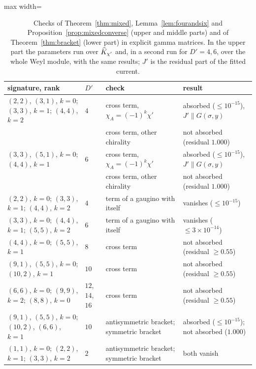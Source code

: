 \begin{table}[htbp]
\centering
\begin{adjustbox}{max width=\linewidth}\begin{tabular}{@{}llll@{}}
\toprule
signature, rank & $D'$ & check & result\\
\midrule
$(2,2)$, $(3,1)$, $k=0$; $(3,3)$, $k=1$; $(4,4)$, $k=2$ & $4$ & cross term, $\chi_A=(-1)^k\chi'$ & absorbed ($\le10^{-15}$), $J'\parallel G(\sigma,y)$\\
 & & cross term, other chirality & not absorbed (residual $1.000$)\\
$(3,3)$, $(5,1)$, $k=0$; $(4,4)$, $k=1$ & $6$ & cross term, $\chi_A=(-1)^k\chi'$ & absorbed ($\le10^{-15}$), $J'\parallel G(\sigma,y)$\\
 & & cross term, other chirality & not absorbed (residual $1.000$)\\
$(2,2)$, $k=0$; $(3,3)$, $k=1$; $(4,4)$, $k=2$ & $4$ & term of a gaugino with itself & vanishes ($\le10^{-15}$)\\
$(3,3)$, $k=0$; $(4,4)$, $k=1$; $(5,5)$, $k=2$ & $6$ & term of a gaugino with itself & vanishes ($\le3\times10^{-14}$)\\
\midrule
$(4,4)$, $k=0$; $(5,5)$, $k=1$ & $8$ & cross term & not absorbed (residual $\ge0.55$)\\
$(9,1)$, $(5,5)$, $k=0$; $(10,2)$, $k=1$ & $10$ & cross term & not absorbed (residual $\ge0.55$)\\
$(6,6)$, $k=0$; $(9,9)$, $k=2$; $(8,8)$, $k=0$ & $12$, $14$, $16$ & cross term & not absorbed (residual $\ge0.55$)\\
\midrule
$(9,1)$, $(5,5)$, $k=0$; $(10,2)$, $(6,6)$, $k=1$ & $10$ & antisymmetric bracket; symmetric bracket & absorbed ($\le10^{-15}$); not absorbed ($1.000$)\\
$(1,1)$, $k=0$; $(2,2)$, $k=1$; $(3,3)$, $k=2$ & $2$ & antisymmetric bracket; symmetric bracket & both vanish\\
\bottomrule
\end{tabular}\end{adjustbox}
\caption{Checks of Theorem~\ref{thm:mixed}, Lemma~\ref{lem:fourandsix} and Proposition~\ref{prop:mixedconverse} (upper and middle parts) and of Theorem~\ref{thm:bracket} (lower part) in explicit gamma matrices. In the upper part the parameters run over $\widehat{K}_{\chi'}$ and, in a second run for $D'=4,6$, over the whole Weyl module, with the same results; $J'$ is the residual part of the fitted current.}
\label{tab:mixed}
\end{table}
\FloatBarrier

